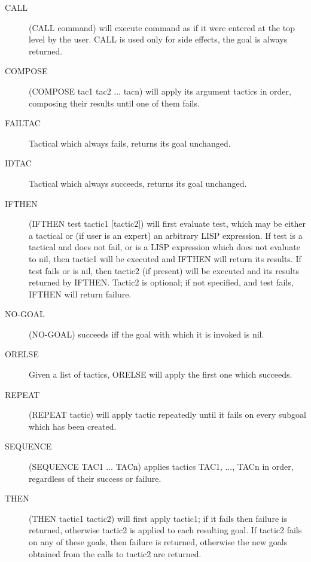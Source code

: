 \begin{description} 
\item[CALL]  
(CALL command) will execute command as if it were entered at the
top level by the user.  CALL is used only for side effects, the goal is
always returned.

\item[COMPOSE]  
(COMPOSE tac1 tac2 ... tacn) will apply its argument tactics
in order, composing their results until one of them fails.

\item[FAILTAC]  
Tactical which always fails, returns its goal unchanged.

\item[IDTAC]  
Tactical which always succeeds, returns its goal unchanged.

\item[IFTHEN]  
(IFTHEN test tactic1 [tactic2]) will first evaluate test, which may
be either a tactical or (if user is an expert) an arbitrary LISP expression.
If test is a tactical and does not fail, or is a LISP expression which does
not evaluate to nil, then tactic1 will be executed and IFTHEN will return its
results.  If test fails or is nil, then tactic2  (if present) will be executed
and its results returned by IFTHEN.  Tactic2 is optional; if not specified,
and test fails, IFTHEN will return failure.

\item[NO-GOAL]  
(NO-GOAL) succeeds iff the goal with which it is invoked is nil.

\item[ORELSE]  
Given a list of tactics, ORELSE will apply the first one which succeeds.

\item[REPEAT]  
(REPEAT tactic) will apply tactic repeatedly until it fails on
every subgoal which has been created.

\item[SEQUENCE]  
(SEQUENCE TAC1 ... TACn) applies tactics TAC1, ..., TACn in order,
regardless of their success or failure. 

\item[THEN]  
(THEN tactic1 tactic2) will first apply tactic1; if it fails
 then failure is returned, otherwise tactic2 is applied to each resulting
 goal.  If tactic2 fails on any of these goals, then failure is returned,
 otherwise the new goals obtained from the calls to tactic2 are returned.


\end{description}
